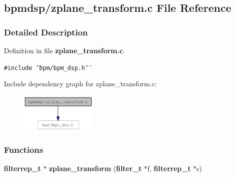 \subsection{bpmdsp/zplane\_\-transform.c File Reference}
\label{zplane__transform_8c}


\subsubsection{Detailed Description}


Definition in file {\bf zplane\_\-transform.c}.

{\tt \#include \char`\"{}bpm/bpm\_\-dsp.h\char`\"{}}\par


Include dependency graph for zplane\_\-transform.c:\nopagebreak
\begin{figure}[H]
\begin{center}
\leavevmode
\includegraphics[width=105pt]{zplane__transform_8c__incl}
\end{center}
\end{figure}
\subsubsection*{Functions}
\begin{CompactItemize}
\item 
{\bf filterrep\_\-t} $\ast$ {\bf zplane\_\-transform} ({\bf filter\_\-t} $\ast$f, {\bf filterrep\_\-t} $\ast$s)
\end{CompactItemize}
